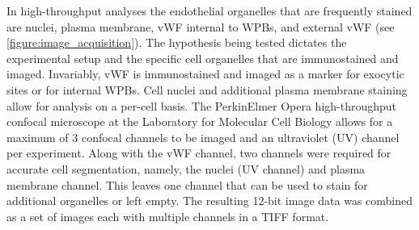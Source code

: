In high-throughput analyses the endothelial organelles that are frequently stained are nuclei, plasma membrane, vWF internal to WPBs, and external vWF (see \autoref{figure:image_acquisition}). The hypothesis being tested dictates the experimental setup and the specific cell organelles that are immunostained and imaged. Invariably, vWF is immunostained and imaged as a marker for exocytic sites or for internal WPBs. Cell nuclei and additional plasma membrane staining allow for analysis on a per-cell basis. The PerkinElmer Opera high-throughput confocal microscope at the Laboratory for Molecular Cell Biology allows for a maximum of 3 confocal channels to be imaged and an ultraviolet (UV) channel per experiment. Along with the vWF channel, two channels were required for accurate cell segmentation, namely, the nuclei (UV channel) and plasma membrane channel. This leaves one channel that can be used to stain for additional organelles or left empty. The resulting 12-bit image data was combined as a set of images each with multiple channels in a TIFF format.

